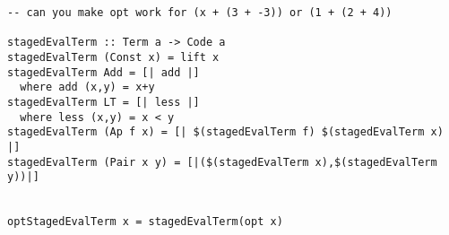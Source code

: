 \documentclass[11pt,twoside,A4]{llncs}
\begin{document}
{\begin{verbatim}
-- can you make opt work for (x + (3 + -3)) or (1 + (2 + 4))

stagedEvalTerm :: Term a -> Code a
stagedEvalTerm (Const x) = lift x
stagedEvalTerm Add = [| add |]
  where add (x,y) = x+y
stagedEvalTerm LT = [| less |]
  where less (x,y) = x < y
stagedEvalTerm (Ap f x) = [| $(stagedEvalTerm f) $(stagedEvalTerm x) |]
stagedEvalTerm (Pair x y) = [|($(stagedEvalTerm x),$(stagedEvalTerm y))|]


optStagedEvalTerm x = stagedEvalTerm(opt x)

\end{verbatim}}
 
\end{document}
